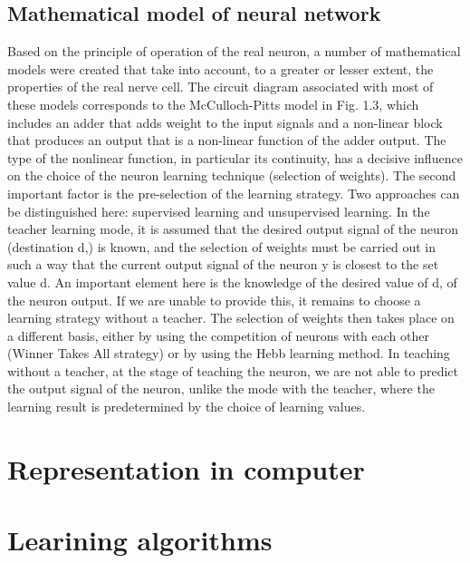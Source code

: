 \subsection{Mathematical model of neural network}
\label{sec:maths}
Based on the principle of operation of the real neuron, a number of mathematical models were 
created that take into account, to a greater or lesser extent, the properties of 
the real nerve cell. 
The circuit diagram associated with most of these models corresponds to the McCulloch-Pitts model 
in Fig. 1.3, which includes an adder that adds weight to the input signals and a 
non-linear block that produces an output that is a non-linear function of the adder output. 
The type of the nonlinear function, in particular its continuity, has a decisive influence on 
the choice of the neuron learning technique (selection of weights). 
The second important factor is the pre-selection of the learning strategy. 
Two approaches can be distinguished here: supervised learning and unsupervised learning. 
In the teacher learning mode, it is assumed that the desired output signal of the neuron 
(destination d,) is known, and the selection of weights must be carried out in such a way that the 
current output signal of the neuron y is closest to the set value d. 
An important element here is the knowledge of the desired value of d, of the neuron output. 
If we are unable to provide this, it remains to choose a learning strategy without a teacher. 
The selection of weights then takes place on a different basis, either by using the competition of 
neurons with each other (Winner Takes All strategy) or by using the Hebb learning method. 
In teaching without a teacher, at the stage of teaching the neuron, we are not able to predict the 
output signal of the neuron, unlike the mode with the teacher, where the learning result 
is predetermined by the choice of learning values. 

\FloatBarrier
\section{Representation in computer}

\FloatBarrier
\section{Learining algorithms}

